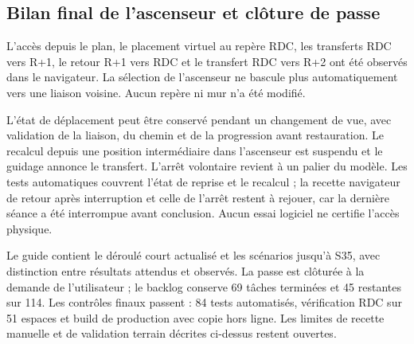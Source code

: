 \documentclass[11pt,a4paper]{article}
\begin{document}
\subsection{Bilan final de l'ascenseur et clôture de passe}
L'accès depuis le plan, le placement virtuel au repère RDC, les transferts RDC vers R+1, le retour R+1 vers RDC et le transfert RDC vers R+2 ont été observés dans le navigateur. La sélection de l'ascenseur ne bascule plus automatiquement vers une liaison voisine. Aucun repère ni mur n'a été modifié.

L'état de déplacement peut être conservé pendant un changement de vue, avec validation de la liaison, du chemin et de la progression avant restauration. Le recalcul depuis une position intermédiaire dans l'ascenseur est suspendu et le guidage annonce le transfert. L'arrêt volontaire revient à un palier du modèle. Les tests automatiques couvrent l'état de reprise et le recalcul ; la recette navigateur de retour après interruption et celle de l'arrêt restent à rejouer, car la dernière séance a été interrompue avant conclusion. Aucun essai logiciel ne certifie l'accès physique.

Le guide contient le déroulé court actualisé et les scénarios jusqu'à S35, avec distinction entre résultats attendus et observés. La passe est clôturée à la demande de l'utilisateur ; le backlog conserve 69 tâches terminées et 45 restantes sur 114.
Les contrôles finaux passent : 84 tests automatisés, vérification RDC sur 51 espaces et build de production avec copie hors ligne. Les limites de recette manuelle et de validation terrain décrites ci-dessus restent ouvertes.
\end{document}
